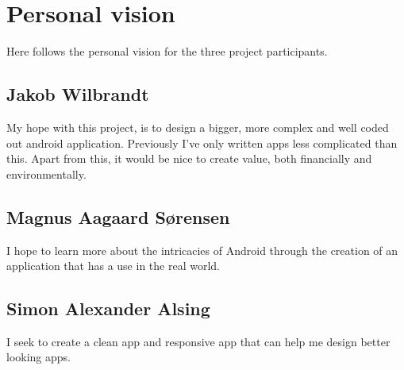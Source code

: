 
\chapter{Personal vision}
Here follows the personal vision for the three project participants.

\section{Jakob Wilbrandt}

My hope with this project, is to design a bigger, more complex and well coded out android application. Previously I've only written apps less complicated than this. Apart from this, it would be nice to create value, both financially and environmentally.


\section{Magnus Aagaard Sørensen}
I hope to learn more about the intricacies of Android through the creation of an application that has a use in the real world.


\section{Simon Alexander Alsing}

I seek to create a clean app and responsive app that can help me design better looking apps.